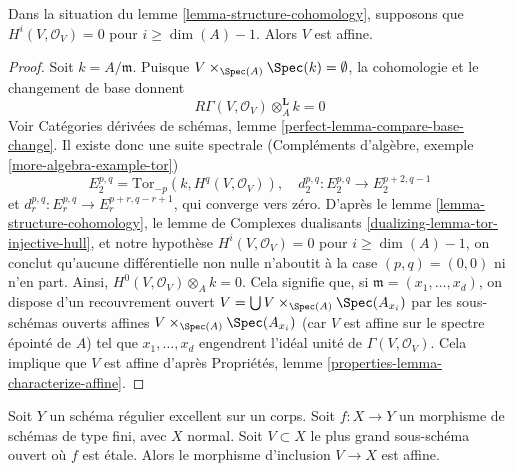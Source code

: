 \begin{lemma}
\label{lemma-conclude}
Dans la situation du lemme \ref{lemma-structure-cohomology},
supposons que $H^i(V, \mathcal{O}_V) = 0$ pour $i \geq \dim(A) - 1$.
Alors $V$ est affine.
\end{lemma}

\begin{proof}
Soit $k = A/\mathfrak m$. Puisque $V \times_{\Spec(A)} \Spec(k) = \emptyset$,
la cohomologie et le changement de base donnent
$$
R\Gamma(V, \mathcal{O}_V) \otimes_A^\mathbf{L} k = 0
$$
Voir
Catégories dérivées de schémas, lemme \ref{perfect-lemma-compare-base-change}.
Il existe donc une suite spectrale
(Compléments d'algèbre, exemple \ref{more-algebra-example-tor})
$$
E_2^{p, q} = \text{Tor}_{-p}(k, H^q(V, \mathcal{O}_V)),\quad
d_2^{p, q} : E_2^{p, q} \to E_2^{p + 2, q - 1}
$$
et $d_r^{p, q} : E_r^{p, q} \to E_r^{p + r, q - r + 1}$,
qui converge vers zéro. D'après le lemme \ref{lemma-structure-cohomology},
le lemme de Complexes dualisants \ref{dualizing-lemma-tor-injective-hull},
et notre hypothèse $H^i(V, \mathcal{O}_V) = 0$ pour $i \geq \dim(A) - 1$,
on conclut qu'aucune différentielle non nulle
n'aboutit à la case $(p, q) = (0, 0)$ ni n'en part. Ainsi,
$H^0(V, \mathcal{O}_V) \otimes_A k = 0$. Cela signifie que,
si $\mathfrak m = (x_1, \ldots, x_d)$, on dispose
d'un recouvrement ouvert $V = \bigcup V \times_{\Spec(A)} \Spec(A_{x_i})$
par les sous-schémas ouverts affines $V \times_{\Spec(A)} \Spec(A_{x_i})$
(car $V$ est affine sur le spectre épointé de $A$)
tel que $x_1, \ldots, x_d$ engendrent
l'idéal unité de $\Gamma(V, \mathcal{O}_V)$.
Cela implique que $V$ est affine d'après
Propriétés, lemme \ref{properties-lemma-characterize-affine}.
\end{proof}

\begin{theorem}
\label{theorem-global}
Soit $Y$ un schéma régulier excellent sur un corps. Soit $f : X \to Y$
un morphisme de schémas de type fini, avec $X$ normal. Soit $V \subset X$
le plus grand sous-schéma ouvert où $f$ est \'etale. Alors le morphisme
d'inclusion $V \to X$ est affine.
\end{theorem}

